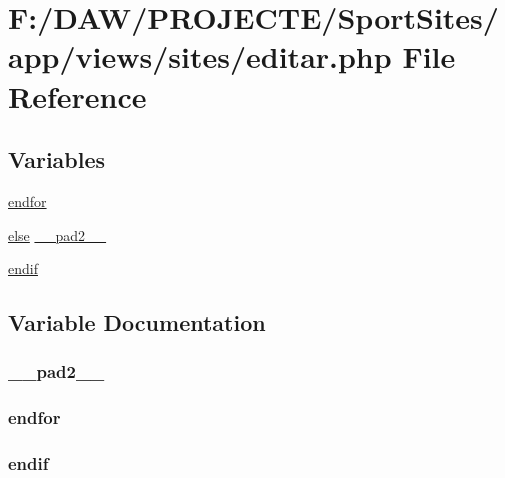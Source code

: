 \hypertarget{sites_2editar_8php}{}\section{F\+:/\+D\+A\+W/\+P\+R\+O\+J\+E\+C\+T\+E/\+Sport\+Sites/app/views/sites/editar.php File Reference}
\label{sites_2editar_8php}
\subsection*{Variables}
\begin{DoxyCompactItemize}
\item 
\hyperlink{sites_2editar_8php_ae8fdc27183f296411bac00ed522ee1ac}{endfor}
\item 
\hyperlink{header_8php_ae69d798cba64778886b1a564b11f2793}{else} \hyperlink{sites_2editar_8php_aed2d37b4e8da3f52103ae96ce9d26d82}{\+\_\+\+\_\+pad2\+\_\+\+\_\+}
\item 
\hyperlink{sites_2editar_8php_a82cd33ca97ff99f2fcc5e9c81d65251b}{endif}
\end{DoxyCompactItemize}


\subsection{Variable Documentation}
\hypertarget{sites_2editar_8php_aed2d37b4e8da3f52103ae96ce9d26d82}{}
\subsubsection[{\+\_\+\+\_\+pad2\+\_\+\+\_\+}]{ \+\_\+\+\_\+pad2\+\_\+\+\_\+}\label{sites_2editar_8php_aed2d37b4e8da3f52103ae96ce9d26d82}
\hypertarget{sites_2editar_8php_ae8fdc27183f296411bac00ed522ee1ac}{}
\subsubsection[{endfor}]{\setlength{\rightskip}{0pt plus 5cm}endfor}\label{sites_2editar_8php_ae8fdc27183f296411bac00ed522ee1ac}
\hypertarget{sites_2editar_8php_a82cd33ca97ff99f2fcc5e9c81d65251b}{}
\subsubsection[{endif}]{\setlength{\rightskip}{0pt plus 5cm}endif}\label{sites_2editar_8php_a82cd33ca97ff99f2fcc5e9c81d65251b}
